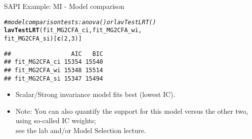 \documentclass[10pt]{beamer}\usepackage[]{graphicx}\usepackage[]{xcolor}
\makeatletter
\newcommand{\hlnum}[1]{\textcolor[rgb]{0.686,0.059,0.569}{#1}}%
\newcommand{\hlcom}[1]{\textcolor[rgb]{0.678,0.584,0.686}{\textit{#1}}}%
\newcommand{\hldef}[1]{\textcolor[rgb]{0.345,0.345,0.345}{#1}}%
\newcommand{\hlkwd}[1]{\textcolor[rgb]{0.737,0.353,0.396}{\textbf{#1}}}%
\newenvironment{kframe}{%
 \def\at@end@of@kframe{}%
 \ifinner\ifhmode%
  \def\at@end@of@kframe{\end{minipage}}%
  \begin{minipage}{\columnwidth}%
 \fi\fi%
 \def\FrameCommand##1{\hskip\@totalleftmargin \hskip-\fboxsep
 \colorbox{shadecolor}{##1}\hskip-\fboxsep
     \hskip-\linewidth \hskip-\@totalleftmargin \hskip\columnwidth}%
 \MakeFramed {\advance\hsize-\width
   \@totalleftmargin\z@ \linewidth\hsize
   \@setminipage}}%
 {\par\unskip\endMakeFramed%
 \at@end@of@kframe}
\newenvironment{knitrout}{}{} %
\makeatother
\begin{document}
%
\begin{frame}[fragile]{SAPI Example: MI - Model comparison}

\begin{knitrout}
\color{fgcolor}\begin{kframe}
\begin{alltt}
\hlcom{# model comparison tests: anova() or lavTestLRT()}
\hlkwd{lavTestLRT}\hldef{(fit_MG2CFA_ci, fit_MG2CFA_wi,}
           \hldef{fit_MG2CFA_si)[}\hlkwd{c}\hldef{(}\hlnum{2}\hldef{,}\hlnum{3}\hldef{)]}
\end{alltt}
\begin{verbatim}
##                 AIC   BIC
## fit_MG2CFA_ci 15354 15540
## fit_MG2CFA_wi 15348 15514
## fit_MG2CFA_si 15347 15494
\end{verbatim}
\end{kframe}
\end{knitrout}

\begin{itemize}
    \item Scalar/Strong invariance model fits best (lowest IC).
    \item Note: You can also quantify the support for this model versus the other two, using so-called IC weights; \\
    see the lab and/or Model Selection lecture.
\end{itemize}

\end{frame}
%
\end{document}
